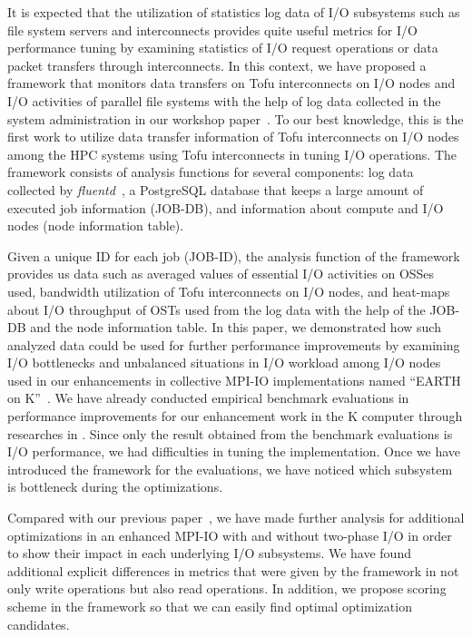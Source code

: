 \documentclass{jhps}
\begin{document}
It is expected that the utilization of statistics log data of I/O subsystems
such as file system servers and interconnects provides quite useful metrics
for I/O performance tuning by examining statistics
of I/O request operations or data packet transfers through interconnects.
In this context, we have proposed a framework that monitors data transfers
on Tofu interconnects on I/O nodes and I/O activities of parallel file systems
with the help of log data collected in the system administration
in our workshop paper~\cite{tsujita:hpc_iodc20}.
To our best knowledge, this is the first work to utilize data transfer information of
Tofu interconnects on I/O nodes among the HPC systems using Tofu interconnects
in tuning I/O operations.
The framework consists of analysis functions for several components:
log data collected by {\itshape fluentd}~\cite{fluentd:web},
a PostgreSQL database that keeps a large amount of executed job information (JOB-DB),
and information about compute and I/O nodes (node information table).

Given a unique ID for each job (JOB-ID), the analysis function of the framework
provides us data such as averaged values of essential I/O activities on OSSes used,
bandwidth utilization of Tofu interconnects on I/O nodes, and heat-maps about
I/O throughput of OSTs used from the log data with the help of the JOB-DB
and the node information table.
In this paper, we demonstrated how such analyzed data could be used for further
performance improvements by examining I/O bottlenecks and unbalanced situations
in I/O workload among I/O nodes used in our enhancements in collective MPI-IO
implementations named ``EARTH on K''~\cite{tsujita:WS_EuroMPI2014,tsujita:hpcasia18}.
We have already conducted empirical benchmark evaluations
in performance improvements for our enhancement work in the K computer
through researches in \cite{tsujita:WS_EuroMPI2014,tsujita:hpcasia18}.
Since only the result obtained from the benchmark evaluations is I/O performance,
we had difficulties in tuning the implementation.
Once we have introduced the framework for the evaluations,
we have noticed which subsystem is bottleneck during the optimizations.

Compared with our previous paper~\cite{tsujita:hpc_iodc20},
we have made further analysis for additional optimizations
in an enhanced MPI-IO with and without two-phase I/O
in order to show their impact in each underlying I/O subsystems.
We have found additional explicit differences in metrics
that were given by the framework in not only write operations
but also read operations.
In addition, we propose scoring scheme in the framework
so that we can easily find optimal optimization candidates.
\end{document}
